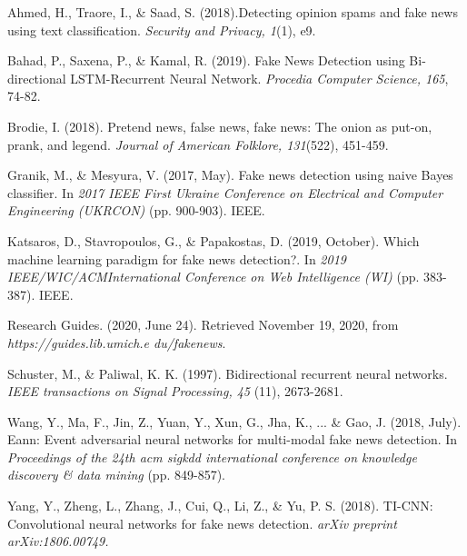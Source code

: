 \documentclass{article}
\begin{document}
\begin{multicols}{2}
\begin{thebibliography}{9}
Ahmed, H., Traore, I., \& Saad, S. (2018).Detecting opinion spams and fake news using text classification.
\textit {Security and Privacy, 1}(1), e9.

Bahad, P., Saxena, P., \& Kamal, R. (2019). Fake News Detection using Bi-directional LSTM-Recurrent Neural Network. 
\textit {Procedia Computer Science, 165}, 74-82.

Brodie, I. (2018). Pretend news, false news, fake news: The onion as put-on, prank, and legend.
\textit {Journal of American Folklore, 131}(522), 451-459.

Granik, M., \& Mesyura, V. (2017, May). Fake news detection using naive Bayes classifier. In
\textit {2017 IEEE First Ukraine Conference on Electrical and Computer Engineering (UKRCON)} (pp. 900-903). IEEE.

Katsaros, D., Stavropoulos, G., \& Papakostas, D. (2019, October). Which machine learning paradigm for fake news detection?. In
\textit {2019 IEEE/WIC/ACMInternational Conference on Web Intelligence (WI)} (pp.  383-387). IEEE.

Research Guides. (2020, June 24).
Retrieved November 19, 2020, from 
\textit{https://guides.lib.umich.e
du/fakenews}. 

Schuster, M., \& Paliwal, K. K. (1997). Bidirectional recurrent neural networks. 
\textit {IEEE transactions on Signal Processing, 45} (11), 2673-2681.

Wang, Y., Ma, F., Jin, Z., Yuan, Y., Xun, G., Jha, K., ... \& Gao, J. (2018, July). Eann: Event adversarial neural networks for multi-modal fake news detection. In 
\textit {Proceedings of the 24th acm sigkdd international conference on knowledge discovery & data mining} (pp. 849-857).

Yang, Y., Zheng, L., Zhang, J., Cui, Q., Li, Z., \& Yu, P. S. (2018). TI-CNN: Convolutional neural networks for fake news detection. 
\textit {arXiv preprint arXiv:1806.00749.}

\end{thebibliography}

\end{multicols}
\end{document}
